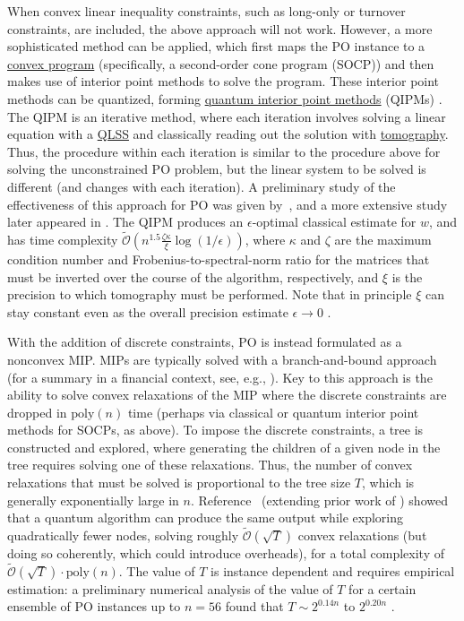 \begin{refsection}
When convex linear inequality constraints, such as long-only or turnover constraints, are included, the above approach will not work. However, a more sophisticated method can be applied, which first maps the PO instance to a \hyperref[appl:ConicProgramming]{convex program} (specifically, a second-order cone program (SOCP)) and then makes use of interior point methods to solve the program. These interior point methods can be quantized, forming \hyperref[prim:QIPM]{quantum interior point methods} (QIPMs) \cite{kerenidis2019QAlgsSecondOrderConeSVM,augustino2022inexact}.
The QIPM is an iterative method, where each iteration involves solving a linear equation with a \hyperref[prim:QuantumLinearSystemSolvers]{QLSS} and classically reading out the solution with \hyperref[prim:Tomography]{tomography}. Thus, the procedure within each iteration is similar to the procedure above for solving the unconstrained PO problem, but the linear system to be solved is different (and changes with each iteration). A preliminary study of the effectiveness of this approach for PO was given by~\cite{kerenidis2019PortfolioOptimization}, and a more extensive study later appeared in \cite{dalzell2022socp}. The QIPM produces an $\epsilon$-optimal classical estimate for $w$, and has time complexity $\tilde{\mathcal{O}}(n^{1.5}\frac{\zeta\kappa}{\xi}\log(1/\epsilon))$, where $\kappa$ and $\zeta$ are the maximum condition number and Frobenius-to-spectral-norm ratio for the matrices that must be inverted over the course of the algorithm, respectively, and  $\xi$ is the precision to which tomography must be performed. Note that in principle $\xi$ can stay constant even as the overall precision estimate $\epsilon \rightarrow 0$ \cite{dalzell2022socp}.  

With the addition of discrete constraints, PO is instead formulated as a nonconvex MIP. MIPs are typically solved with a branch-and-bound approach (for a summary in a financial context, see, e.g., \cite[Chapter 11]{cornuejols2006optimizationFinance}). Key to this approach is the ability to solve convex relaxations of the MIP where the discrete constraints are dropped in $\mathrm{poly}(n)$ time (perhaps via classical or quantum interior point methods for SOCPs, as above). To impose the discrete constraints, a tree is constructed and explored, where generating the children of a given node in the tree requires solving one of these relaxations. Thus, the number of convex relaxations that must be solved is proportional to the tree size $T$, which is generally exponentially large in $n$. Reference~\cite{chakrabarti2022universal} (extending prior work of \cite{montanaro2019QBranchAndBound}) showed that a quantum algorithm can produce the same output while exploring quadratically fewer nodes, solving roughly $\tilde{\mathcal{O}}(\sqrt{T})$ convex relaxations (but doing so coherently, which could introduce overheads), for a total complexity of $\tilde{\mathcal{O}}(\sqrt{T}) \cdot \mathrm{poly}(n)$. The value of $T$ is instance dependent and requires empirical estimation: a preliminary numerical analysis of the value of $T$ for a certain ensemble of PO instances up to $n=56$ found that $T\sim 2^{0.14n}$ to $2^{0.20n}$ \cite{chakrabarti2022universal}.


\end{refsection}
